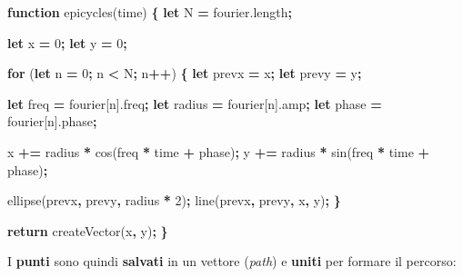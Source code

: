 \documentclass[
]{book}
\newenvironment{Shaded}{\begin{snugshade}}{\end{snugshade}}
\newcommand{\AttributeTok}[1]{\textcolor[rgb]{0.77,0.63,0.00}{#1}}
\newcommand{\ControlFlowTok}[1]{\textcolor[rgb]{0.13,0.29,0.53}{\textbf{#1}}}
\newcommand{\DecValTok}[1]{\textcolor[rgb]{0.00,0.00,0.81}{#1}}
\newcommand{\KeywordTok}[1]{\textcolor[rgb]{0.13,0.29,0.53}{\textbf{#1}}}
\newcommand{\NormalTok}[1]{#1}
\newcommand{\OperatorTok}[1]{\textcolor[rgb]{0.81,0.36,0.00}{\textbf{#1}}}
\newcommand{\VariableTok}[1]{\textcolor[rgb]{0.00,0.00,0.00}{#1}}
\begin{document}
\begin{Shaded}
\begin{Highlighting}[]
\KeywordTok{function} \AttributeTok{epicycles}\NormalTok{(time) }\OperatorTok{\{}
  \KeywordTok{let}\NormalTok{ N }\OperatorTok{=} \VariableTok{fourier}\NormalTok{.}\AttributeTok{length}\OperatorTok{;}
  
  \KeywordTok{let}\NormalTok{ x }\OperatorTok{=} \DecValTok{0}\OperatorTok{;}
  \KeywordTok{let}\NormalTok{ y }\OperatorTok{=} \DecValTok{0}\OperatorTok{;}

  \ControlFlowTok{for}\NormalTok{ (}\KeywordTok{let}\NormalTok{ n }\OperatorTok{=} \DecValTok{0}\OperatorTok{;}\NormalTok{ n }\OperatorTok{<}\NormalTok{ N}\OperatorTok{;}\NormalTok{ n}\OperatorTok{++}\NormalTok{) }\OperatorTok{\{}
    \KeywordTok{let}\NormalTok{ prevx }\OperatorTok{=}\NormalTok{ x}\OperatorTok{;}
    \KeywordTok{let}\NormalTok{ prevy }\OperatorTok{=}\NormalTok{ y}\OperatorTok{;}

    \KeywordTok{let}\NormalTok{ freq }\OperatorTok{=}\NormalTok{ fourier[n].}\AttributeTok{freq}\OperatorTok{;}
    \KeywordTok{let}\NormalTok{ radius }\OperatorTok{=}\NormalTok{ fourier[n].}\AttributeTok{amp}\OperatorTok{;}
    \KeywordTok{let}\NormalTok{ phase }\OperatorTok{=}\NormalTok{ fourier[n].}\AttributeTok{phase}\OperatorTok{;}

\NormalTok{    x }\OperatorTok{+=}\NormalTok{ radius }\OperatorTok{*} \AttributeTok{cos}\NormalTok{(freq }\OperatorTok{*}\NormalTok{ time }\OperatorTok{+}\NormalTok{ phase)}\OperatorTok{;}
\NormalTok{    y }\OperatorTok{+=}\NormalTok{ radius }\OperatorTok{*} \AttributeTok{sin}\NormalTok{(freq }\OperatorTok{*}\NormalTok{ time }\OperatorTok{+}\NormalTok{ phase)}\OperatorTok{;}

    \AttributeTok{ellipse}\NormalTok{(prevx}\OperatorTok{,}\NormalTok{ prevy}\OperatorTok{,}\NormalTok{ radius }\OperatorTok{*} \DecValTok{2}\NormalTok{)}\OperatorTok{;}
    \AttributeTok{line}\NormalTok{(prevx}\OperatorTok{,}\NormalTok{ prevy}\OperatorTok{,}\NormalTok{ x}\OperatorTok{,}\NormalTok{ y)}\OperatorTok{;}
  \OperatorTok{\}}
  
  \ControlFlowTok{return} \AttributeTok{createVector}\NormalTok{(x}\OperatorTok{,}\NormalTok{ y)}\OperatorTok{;}
\OperatorTok{\}}
\end{Highlighting}
\end{Shaded}

I \textbf{punti} sono quindi \textbf{salvati} in un vettore (\emph{path}) e \textbf{uniti} per formare il percorso:
\end{document}
